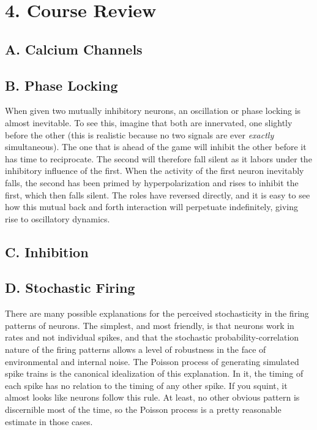 \documentclass[12pt]{article}
\begin{document}
\maketitle

\section{4. Course Review}

\subsection{A. Calcium Channels}



\subsection{B. Phase Locking}

When given two mutually inhibitory neurons, an oscillation or phase locking is almost inevitable.  To see this, imagine that both are innervated, one slightly before the other (this is realistic because no two signals are ever {\em exactly} simultaneous).  The one that is ahead of the game will inhibit the other before it has time to reciprocate.  The second will therefore fall silent as it labors under the inhibitory influence of the first.  When the activity of the first neuron inevitably falls, the second has been primed by hyperpolarization and rises to inhibit the first, which then falls silent.  The roles have reversed directly, and it is easy to see how this mutual back and forth interaction will perpetuate indefinitely, giving rise to oscillatory dynamics.

\subsection{C. Inhibition}



\subsection{D. Stochastic Firing}

There are many possible explanations for the perceived stochasticity in the firing patterns of neurons.  The simplest, and most friendly, is that neurons work in rates and not individual spikes, and that the stochastic probability-correlation nature of the firing patterns allows a level of robustness in the face of environmental and internal noise.  The Poisson process of generating simulated spike trains is the canonical idealization of this explanation.  In it, the timing of each spike has no relation to the timing of any other spike.  If you squint, it almost looks like neurons follow this rule.  At least, no other obvious pattern is discernible most of the time, so the Poisson process is a pretty reasonable estimate in those cases.  
\end{document}
